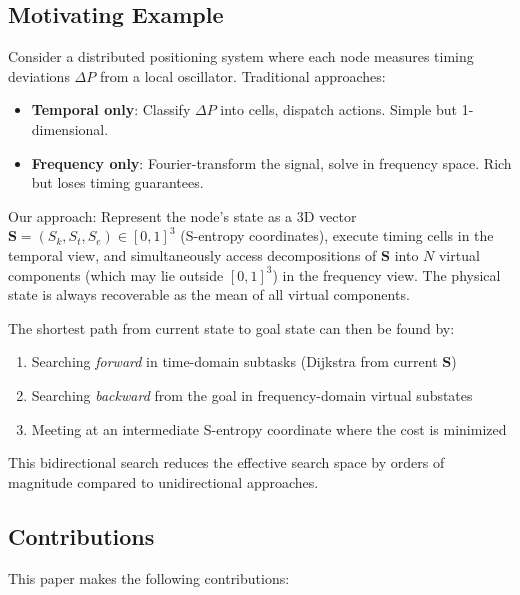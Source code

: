 \documentclass[twocolumn,11pt,a4paper]{article}
\newcommand{\DP}{\Delta P}
\newcommand{\Sk}{S_k}
\newcommand{\St}{S_t}
\newcommand{\Se}{S_e}
\newcommand{\Stuple}{\mathbf{S}}
\begin{document}
\subsection{Motivating Example}

Consider a distributed positioning system where each node measures timing deviations $\DP$ from a local oscillator. Traditional approaches:
\begin{itemize}[nosep]
  \item \textbf{Temporal only}: Classify $\DP$ into cells, dispatch actions. Simple but 1-dimensional.
  \item \textbf{Frequency only}: Fourier-transform the signal, solve in frequency space. Rich but loses timing guarantees.
\end{itemize}

Our approach: Represent the node's state as a 3D vector $\Stuple = (\Sk, \St, \Se) \in [0,1]^3$ (S-entropy coordinates), execute timing cells in the temporal view, and simultaneously access decompositions of $\Stuple$ into $N$ virtual components (which may lie outside $[0,1]^3$) in the frequency view. The physical state is always recoverable as the mean of all virtual components.

The shortest path from current state to goal state can then be found by:
\begin{enumerate}[nosep]
  \item Searching \emph{forward} in time-domain subtasks (Dijkstra from current $\Stuple$)
  \item Searching \emph{backward} from the goal in frequency-domain virtual substates
  \item Meeting at an intermediate S-entropy coordinate where the cost is minimized
\end{enumerate}

This bidirectional search reduces the effective search space by orders of magnitude compared to unidirectional approaches.

\subsection{Contributions}

This paper makes the following contributions:
\end{document}
